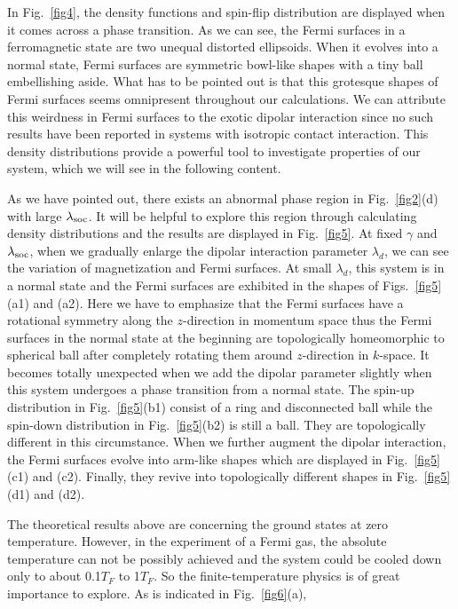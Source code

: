 \documentclass[twocolumn,english,pra,superscriptaddress]{revtex4-1}
\begin{document}
In Fig.~\ref{fig4}, the density functions and spin-flip distribution are displayed when it comes across a phase transition. As we can see, the Fermi surfaces in a ferromagnetic state are two unequal distorted ellipsoids. When it evolves into a normal state, Fermi surfaces are symmetric bowl-like shapes with a tiny ball embellishing aside. What has to be pointed out is that this grotesque shapes of Fermi surfaces seems omnipresent throughout our calculations. We can attribute this weirdness in Fermi surfaces to the exotic dipolar interaction since no such results have been reported in systems with isotropic contact interaction. This density distributions provide a powerful tool to investigate properties of our system, which we will see in the following content.\par
As we have pointed out, there exists an abnormal phase region in Fig.~\ref{fig2}(d) with large $\lambda_{\rm soc}$. It will be helpful to explore this region through calculating density distributions and the results are displayed in Fig.~\ref{fig5}.
At fixed $\gamma$ and $\lambda_{\rm soc}$, when we gradually enlarge the dipolar interaction parameter $\lambda_{d}$, we can see the variation of magnetization and Fermi surfaces. At small $\lambda_{d}$, this system is in a normal state and the Fermi surfaces are exhibited in the shapes of Figs.~\ref{fig5}(a1) and (a2). Here we have to emphasize that the Fermi surfaces have a rotational symmetry along the $z$-direction in momentum space thus the Fermi surfaces in the normal state at the beginning are topologically homeomorphic to spherical ball after completely rotating them around $z$-direction in $k$-space. It becomes totally unexpected when we add the dipolar parameter slightly when this system undergoes a phase transition from a normal state. The spin-up distribution in Fig.~\ref{fig5}(b1) consist of a ring and disconnected ball while the spin-down distribution in Fig.~\ref{fig5}(b2) is still a ball. They are topologically different in this circumstance. When we further augment the dipolar interaction, the Fermi surfaces evolve into arm-like shapes which are displayed in Fig.~\ref{fig5}(c1) and (c2). Finally, they revive into topologically different shapes in Fig.~\ref{fig5}(d1) and (d2).\par
The theoretical results above are concerning the ground states at zero temperature. However, in the experiment of a Fermi gas, the absolute temperature can not be possibly achieved and the system could be cooled down only to about 0.1$T_{F}$ to 1$T_{F}$. So the finite-temperature physics is of great importance to explore. As is indicated in Fig.~\ref{fig6}(a),
\end{document}
